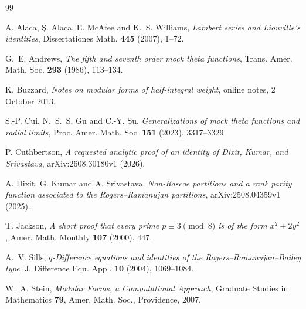 \begin{thebibliography}{99}

A. Alaca, \c{S}. Alaca, E. McAfee and K.~S. Williams,
\emph{Lambert series and Liouville's identities},
Dissertationes Math. \textbf{445} (2007), 1--72.

G.~E. Andrews, \emph{The fifth and seventh order mock theta functions},
Trans. Amer. Math. Soc. \textbf{293} (1986), 113--134.

K. Buzzard, \emph{Notes on modular forms of half-integral weight},
online notes, 2 October 2013.

S.-P. Cui, N.~S.~S. Gu and C.-Y. Su,
\emph{Generalizations of mock theta functions and radial limits},
Proc. Amer. Math. Soc. \textbf{151} (2023), 3317--3329.

P. Cuthbertson, \emph{A requested analytic proof of an identity of Dixit, Kumar, and Srivastava},
arXiv:2608.30180v1 (2026).

A. Dixit, G. Kumar and A. Srivastava,
\emph{Non-Rascoe partitions and a rank parity function associated to the Rogers--Ramanujan partitions},
arXiv:2508.04359v1 (2025).

T. Jackson, \emph{A short proof that every prime $p\equiv3\pmod8$ is of the form $x^2+2y^2$},
Amer. Math. Monthly \textbf{107} (2000), 447.

A.~V. Sills, \emph{$q$-Difference equations and identities of the Rogers--Ramanujan--Bailey type},
J. Difference Equ. Appl. \textbf{10} (2004), 1069--1084.

W.~A. Stein, \emph{Modular Forms, a Computational Approach},
Graduate Studies in Mathematics \textbf{79}, Amer. Math. Soc., Providence, 2007.

\end{thebibliography}
